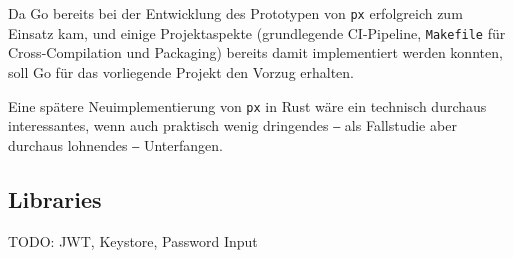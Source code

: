 Da Go bereits bei der Entwicklung des Prototypen von \texttt{px} erfolgreich zum Einsatz kam, und einige Projektaspekte (grundlegende CI-Pipeline, \texttt{Makefile} für Cross-Compilation und Packaging) bereits damit implementiert werden konnten, soll Go für das vorliegende Projekt den Vorzug erhalten.

Eine spätere Neuimplementierung von \texttt{px} in Rust wäre ein technisch durchaus interessantes, wenn auch praktisch wenig dringendes ‒ als Fallstudie aber durchaus lohnendes ‒ Unterfangen.

\subsection{Libraries}

TODO: JWT, Keystore, Password Input
